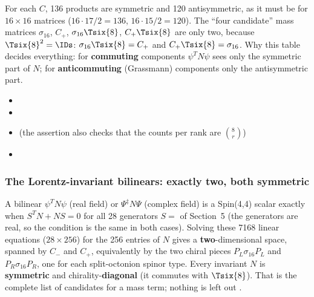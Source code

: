 For each $C$, 136 products are symmetric and 120 antisymmetric, as it must be for $16\times16$
matrices ($16\cdot17/2=136$, $16\cdot15/2=120$). The ``four candidate'' mass matrices
$\sigma_{16}$, $C_+$, $\sigma_{16}\Tsix{8}$, $C_+\Tsix{8}$ are only two, because
$\Tsix{8}^2=\IDs$: $\sigma_{16}\Tsix{8}=C_+$ and $C_+\Tsix{8}=\sigma_{16}$. Why this table decides
everything: for \textbf{commuting} components $\psi^{T}N\psi$ sees only the symmetric part of $N$;
for \textbf{anticommuting} (Grassmann) components only the antisymmetric part.

\begin{itemize}
  \item {}
  \item {}
  \item {} (the assertion also checks that the
        counts per rank are $\binom{8}{r}$)
  \item {}
\end{itemize}

\subsubsection{The Lorentz-invariant bilinears: exactly two, both symmetric}
\label{sec:3.2.2}

A bilinear $\psi^{T}N\psi$ (real field) or $\Psi^{\ddagger}N\Psi$ (complex field) is a Spin(4,4)
scalar exactly when $S^{T}N+NS=0$ for all 28 generators $S=$  of Section~5 (the
generators are real, so the condition is the same in both cases). Solving these 7168 linear
equations ($28\times256$) for the 256 entries of $N$ gives a \textbf{two}-dimensional space, spanned
by $C_-$ and $C_+$, equivalently by the two chiral pieces $P_L\sigma_{16}P_L$ and
$P_R\sigma_{16}P_R$, one for each split-octonion spinor type. Every invariant $N$ is
\textbf{symmetric} and chirality-\textbf{diagonal} (it commutes with $\Tsix{8}$). That is the
complete list of candidates for a mass term; nothing is left out .

